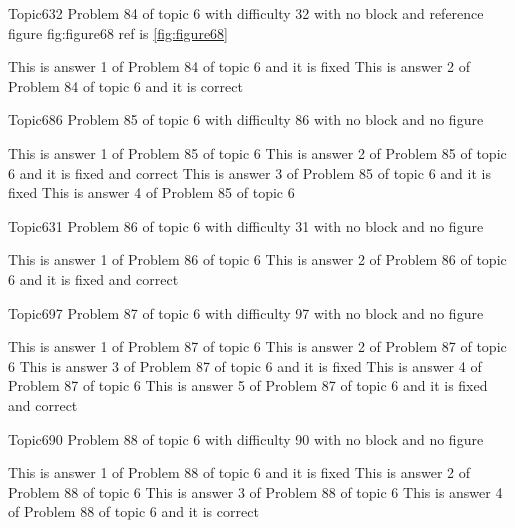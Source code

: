 \documentclass[master]{exam}
\begin{document}
\begin{problem}{Topic6}{32}
	Problem 84 of topic 6 with difficulty 32 with no block and reference figure fig:figure68 ref is \ref{fig:figure68}
	\begin{answers}
		\answer[fixed] This is answer 1 of Problem 84 of topic 6 and it is fixed
		\answer[correct] This is answer 2 of Problem 84 of topic 6 and it is correct
	\end{answers}
\end{problem}

\begin{problem}{Topic6}{86}
	Problem 85 of topic 6 with difficulty 86 with no block and no figure
	\begin{answers}
		\answer This is answer 1 of Problem 85 of topic 6 
		 This is answer 2 of Problem 85 of topic 6 and it is fixed and correct
		\answer[fixed] This is answer 3 of Problem 85 of topic 6 and it is fixed
		\answer This is answer 4 of Problem 85 of topic 6 
	\end{answers}
\end{problem}

\begin{problem}{Topic6}{31}
	Problem 86 of topic 6 with difficulty 31 with no block and no figure
	\begin{answers}
		\answer This is answer 1 of Problem 86 of topic 6 
		 This is answer 2 of Problem 86 of topic 6 and it is fixed and correct
	\end{answers}
\end{problem}

\begin{problem}{Topic6}{97}
	Problem 87 of topic 6 with difficulty 97 with no block and no figure
	\begin{answers}
		\answer This is answer 1 of Problem 87 of topic 6 
		\answer This is answer 2 of Problem 87 of topic 6 
		\answer[fixed] This is answer 3 of Problem 87 of topic 6 and it is fixed
		\answer This is answer 4 of Problem 87 of topic 6 
		 This is answer 5 of Problem 87 of topic 6 and it is fixed and correct
	\end{answers}
\end{problem}

\begin{problem}{Topic6}{90}
	Problem 88 of topic 6 with difficulty 90 with no block and no figure
	\begin{answers}
		\answer[fixed] This is answer 1 of Problem 88 of topic 6 and it is fixed
		\answer This is answer 2 of Problem 88 of topic 6 
		\answer This is answer 3 of Problem 88 of topic 6 
		\answer[correct] This is answer 4 of Problem 88 of topic 6 and it is correct
	\end{answers}
\end{problem}
\end{document}

